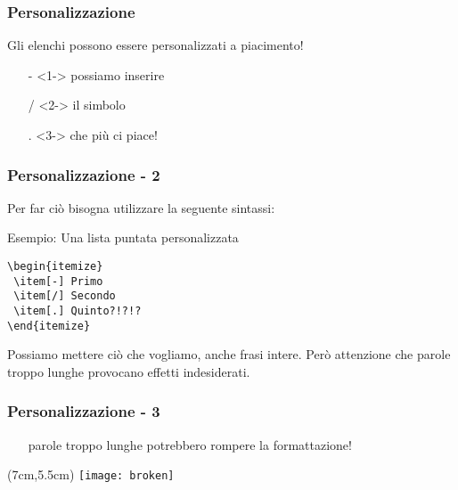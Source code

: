 \begin{frame}
 \frametitle{Personalizzazione}
 
 Gli elenchi possono essere personalizzati a piacimento!
 \begin{itemize}
  \item[-]<1-> possiamo inserire
  \item[/]<2-> il simbolo
  \item[.]<3-> che più ci piace!
 \end{itemize}

\end{frame}

\begin{frame}[fragile]
 \frametitle{Personalizzazione - 2}
 
Per far ciò bisogna utilizzare la seguente sintassi:
 
\begin{block}{Esempio: Una lista puntata personalizzata}
\begin{code}
\begin{verbatim}
\begin{itemize}
 \item[-] Primo
 \item[/] Secondo
 \item[.] Quinto?!?!?
\end{itemize}
\end{verbatim}
\end{code}
\end{block}
 
Possiamo mettere ciò che vogliamo, anche frasi intere. Però 
attenzione che parole troppo lunghe provocano effetti indesiderati.
\end{frame}

\begin{frame}
 \frametitle{Personalizzazione - 3}
 
 \begin{itemize}
  \item[parole troppo lunghe] potrebbero rompere la formattazione!
 \end{itemize}

  
 \begin{textblock*}{5cm}(7cm,5.5cm)
   \texttt{[image: broken]}
 \end{textblock*}
\end{frame}
